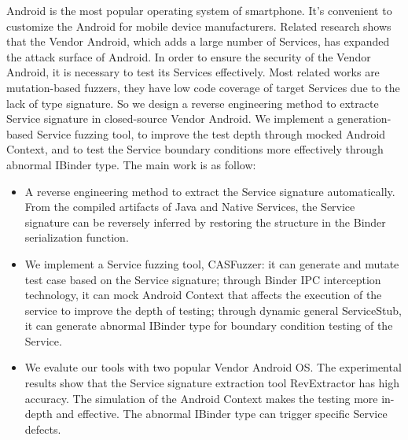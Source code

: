 \documentclass[winfonts,master,twoside]{njuthesis}
\begin{document}
\begin{englishabstract}

Android is the most popular operating system of smartphone. It's convenient to customize the Android for mobile device manufacturers. Related research shows that the Vendor Android, which adds a large number of Services, has expanded the attack surface of Android. In order to ensure the security of the Vendor Android, it is necessary to test its Services effectively. Most related works are mutation-based fuzzers, they have low code coverage of target Services due to the lack of type signature. So we design a reverse engineering method to extracte Service signature in closed-source Vendor Android. We implement a generation-based Service fuzzing tool, to improve the test depth through mocked Android Context, and to test the Service boundary conditions more effectively through abnormal IBinder type. The main work is as follow:
\begin{itemize}
	\item A reverse engineering method to extract the Service signature automatically. From the compiled artifacts of Java and Native Services, the Service signature can be reversely inferred by restoring the structure in the Binder serialization function.
	\item We implement a Service fuzzing tool, CASFuzzer: it can generate and mutate test case based on the Service signature; through Binder IPC interception technology, it can mock Android Context that affects the execution of the service to improve the depth of testing; through dynamic general ServiceStub, it can generate abnormal IBinder type for boundary condition testing of the Service.
	\item We evalute our tools with two popular Vendor Android OS. The experimental results show that the Service signature extraction tool RevExtractor has high accuracy. The simulation of the Android Context makes the testing more in-depth and effective. The abnormal IBinder type can trigger specific Service defects.
\end{itemize}


\end{englishabstract}

\tableofcontents
\end{document}
